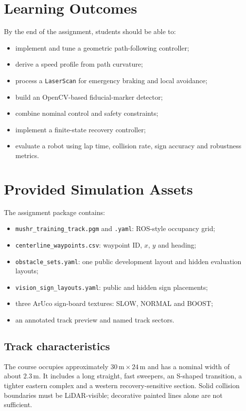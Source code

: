 \documentclass[11pt,a4paper]{article}
\begin{document}
\section{Learning Outcomes}
By the end of the assignment, students should be able to:
\begin{itemize}
  \item implement and tune a geometric path-following controller;
  \item derive a speed profile from path curvature;
  \item process a \texttt{LaserScan} for emergency braking and local avoidance;
  \item build an OpenCV-based fiducial-marker detector;
  \item combine nominal control and safety constraints;
  \item implement a finite-state recovery controller;
  \item evaluate a robot using lap time, collision rate, sign accuracy and robustness metrics.
\end{itemize}

\section{Provided Simulation Assets}
The assignment package contains:
\begin{itemize}
  \item \texttt{mushr\_training\_track.pgm} and \texttt{.yaml}: ROS-style occupancy grid;
  \item \texttt{centerline\_waypoints.csv}: waypoint ID, $x$, $y$ and heading;
  \item \texttt{obstacle\_sets.yaml}: one public development layout and hidden evaluation layouts;
  \item \texttt{vision\_sign\_layouts.yaml}: public and hidden sign placements;
  \item three ArUco sign-board textures: SLOW, NORMAL and BOOST;
  \item an annotated track preview and named track sectors.
\end{itemize}

\subsection{Track characteristics}
The course occupies approximately $30\,\mathrm{m}\times24\,\mathrm{m}$ and has a nominal width of about $2.3\,\mathrm{m}$. It includes a long straight, fast sweepers, an S-shaped transition, a tighter eastern complex and a western recovery-sensitive section. Solid collision boundaries must be LiDAR-visible; decorative painted lines alone are not sufficient.
\end{document}
